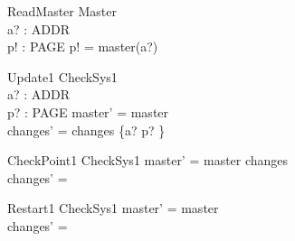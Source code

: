 \documentclass{llncs}
\begin{document}
\begin{schema}{ReadMaster}
\Xi Master \\
a? : ADDR \\
p! : PAGE
\where
p! = master(a?)
\end{schema}

\begin{schema}{Update1}
\Delta CheckSys1 \\
a? : ADDR \\
p? : PAGE
\where
master' = master \\
changes' = changes \oplus \{a? \mapsto p? \}
\end{schema}

\begin{schema}{CheckPoint1}
\Delta CheckSys1  
\where 
master' = master \oplus changes \\
changes' = \emptyset
\end{schema}

\begin{schema}{Restart1}
\Delta CheckSys1 
\where master' = master \\
changes' = \emptyset
\end{schema}
\end{document}
